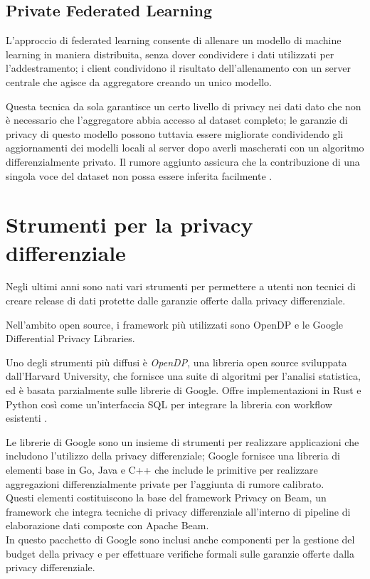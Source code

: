 \subsection{Private Federated Learning}
L'approccio di federated learning consente di allenare un modello di machine learning in maniera distribuita, senza dover condividere i dati utilizzati per l'addestramento; i client condividono il risultato dell'allenamento con un server centrale che agisce da aggregatore creando un unico modello.

Questa tecnica da sola garantisce un certo livello di privacy nei dati dato che non è necessario che l'aggregatore abbia accesso al dataset completo; le garanzie di privacy di questo modello possono tuttavia essere migliorate condividendo gli aggiornamenti dei modelli locali al server dopo averli mascherati con un algoritmo differenzialmente privato. Il rumore aggiunto assicura che la contribuzione di una singola voce del dataset non possa essere inferita facilmente \cite{peterson2019privatefederatedlearningdomain}.

\section{Strumenti per la privacy differenziale}
Negli ultimi anni sono nati vari strumenti per permettere a utenti non tecnici di creare release di dati protette dalle garanzie offerte dalla privacy differenziale.

Nell'ambito open source, i framework più utilizzati sono OpenDP e le Google Differential Privacy Libraries.

Uno degli strumenti più diffusi è \textit{OpenDP}, una libreria open source sviluppata dall'Harvard University, che fornisce una suite di algoritmi per l'analisi statistica, ed è basata parzialmente sulle librerie di Google. Offre implementazioni in Rust e Python così come un'interfaccia SQL per integrare la libreria con workflow esistenti \cite{opendp}.

Le librerie di Google sono un insieme di strumenti per realizzare applicazioni che includono l'utilizzo della privacy differenziale; Google fornisce una libreria di elementi base in Go, Java e C++ che include le primitive per realizzare aggregazioni differenzialmente private per l'aggiunta di rumore calibrato.\\
Questi elementi costituiscono la base del framework Privacy on Beam, un framework che integra tecniche di privacy differenziale all'interno di pipeline di elaborazione dati composte con Apache Beam.\\
In questo pacchetto di Google sono inclusi anche componenti per la gestione del budget della privacy e per effettuare verifiche formali sulle garanzie offerte dalla privacy differenziale.

